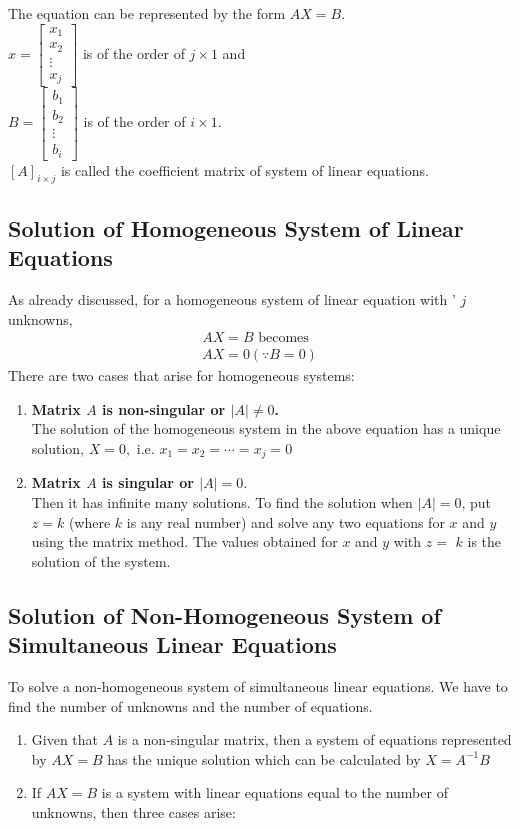The equation can be represented by the form $A X=B$.\\
$x=\left[\begin{array}{c}x_{1} \\ x_{2} \\ \vdots \\ x_{j}\end{array}\right]$ is of the order of $j \times 1$ and\\
$B=\left[\begin{array}{c}b_{1} \\ b_{2} \\ \vdots \\ b_{i}\end{array}\right]$ is of the order of $i \times 1 .$\\ $[A]_{i \times j}$ is called the coefficient matrix of system of linear equations.
\subsection{Solution of Homogeneous System of Linear Equations}
As already discussed, for a homogeneous system of linear equation with ' $j$ unknowns,
$$
\begin{array}{c}
	A X=B \text { becomes } \\
	A X=0(\because B=0)
\end{array}
$$
There are two cases that arise for homogeneous systems:
\begin{enumerate}
	\item  \textbf{Matrix $A$ is non-singular or $|A| \neq 0$.}\\
	The solution of the homogeneous system in the above equation has a unique solution, $X=0,$ i.e. $x_{1}=x_{2}=\cdots=x_{j}=0$
		\item \textbf{Matrix $A$ is singular or $|A|=0.$}\\ Then it has infinite many solutions. To find the solution when $|A|=0$, put $z=k$ (where $k$ is any real number) and solve any two equations for $x$ and $y$ using the matrix method. The values obtained for $x$ and $y$ with $z=$ $k$ is the solution of the system.
\end{enumerate}

\subsection{Solution of Non-Homogeneous System of Simultaneous Linear Equations}
To solve a non-homogeneous system of simultaneous linear equations. We have to find the number of unknowns and the number of equations.
\begin{enumerate}
	\item  Given that $A$ is a non-singular matrix, then a system of equations represented by $A X=B$ has the unique solution which can be calculated by $X=A^{-1} B$
	\item  If $A X=B$ is a system with linear equations equal to the number of unknowns, then three cases arise:
\end{enumerate}

